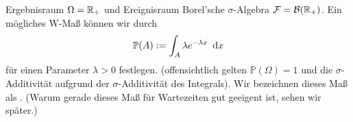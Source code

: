 \begin{beispiel}
    Ergebnisraum $\Omega = \mathbb{R}_+$ und Ereignisraum Borel'sche $\sigma$-Algebra $\mathcal{F} = \mathcal{B}(\mathbb{R}_+)$. Ein mögliches W-Maß können wir durch
    \begin{align*}
        \mathbb{P}(A) \mathrel{:=} \int_A \lambda e^{-\lambda x} \enskip \mathrm{d}x
    \end{align*}
    für einen Parameter $\lambda > 0$ festlegen. (offensichtlich gelten $\mathbb{P}(\Omega) = 1$ und die $\sigma$-Additivität aufgrund der $\sigma$-Additivität des Integrals). Wir bezeichnen dieses Maß als . (Warum gerade dieses Maß für Wartezeiten gut geeigent ist, sehen wir später.)
\end{beispiel}

